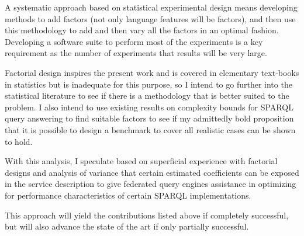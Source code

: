 \documentclass{llncs}
\begin{document}
A systematic approach based on statistical experimental design means
developing methods to add factors (not only language features will be
factors), and then use this methodology to add and then vary all the
factors in an optimal fashion. Developing a software suite to perform
most of the experiments is a key requirement as the number of
experiments that results will be very large.

Factorial design inspires the present work and is covered in
elementary text-books in statistics but is inadequate for this
purpose, so I intend to go further into the statistical literature to
see if there is a methodology that is better suited to the
problem. I also intend to use existing results on complexity bounds
for SPARQL query answering to find suitable factors to see if my
admittedly bold proposition that it is possible to design a benchmark
to cover all realistic cases can be shown to hold.

With this analysis, I speculate based on superficial experience with
factorial designs and analysis of variance that certain estimated
coefficients can be exposed in the service description to give
federated query engines assistance in optimizing for performance
characteristics of certain SPARQL implementations. 

This approach will yield the contributions listed above if completely
successful, but will also advance the state of the art if only
partially successful.


%
%
%

\end{document}
